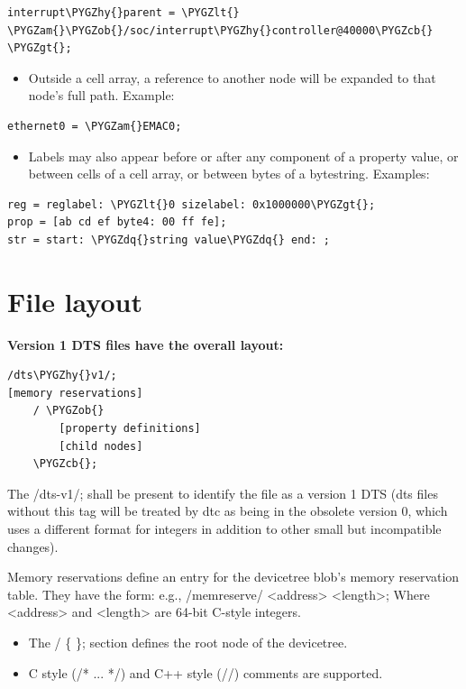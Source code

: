 \documentclass[a4paper,10pt,oneside]{sphinxmanual}
\def\PYGZob{\char`\{}
\def\PYGZcb{\char`\}}
\def\PYGZam{\char`\&}
\def\PYGZlt{\char`\<}
\def\PYGZgt{\char`\>}
\def\PYGZhy{\char`\-}
\def\PYGZdq{\char`\"}
\begin{document}
\begin{Verbatim}[commandchars=\\\{\}]
interrupt\PYGZhy{}parent = \PYGZlt{} \PYGZam{}\PYGZob{}/soc/interrupt\PYGZhy{}controller@40000\PYGZcb{} \PYGZgt{};
\end{Verbatim}
\begin{itemize}
\item {} 
Outside a cell array, a reference to another node will be expanded to
that node’s full path. Example:

\end{itemize}

\begin{Verbatim}[commandchars=\\\{\}]
ethernet0 = \PYGZam{}EMAC0;
\end{Verbatim}
\begin{itemize}
\item {} 
Labels may also appear before or after any component of a property
value, or between cells of a cell array, or between bytes of a
bytestring. Examples:

\end{itemize}

\begin{Verbatim}[commandchars=\\\{\}]
reg = reglabel: \PYGZlt{}0 sizelabel: 0x1000000\PYGZgt{};
prop = [ab cd ef byte4: 00 ff fe];
str = start: \PYGZdq{}string value\PYGZdq{} end: ;
\end{Verbatim}


\section{File layout}
\label{source-language:file-layout}
\textbf{Version 1 DTS files have the overall layout:}

\begin{Verbatim}[commandchars=\\\{\}]
/dts\PYGZhy{}v1/;
[memory reservations]
    / \PYGZob{}
        [property definitions]
        [child nodes]
    \PYGZcb{};
\end{Verbatim}

The /dts-v1/; shall be present to identify the file as a version 1 DTS
(dts files without this tag will be treated by dtc as being in the
obsolete version 0, which uses a different format for integers in
addition to other small but incompatible changes).

Memory reservations define an entry for the devicetree blob’s memory
reservation table. They have the form: e.g., /memreserve/ \textless{}address\textgreater{}
\textless{}length\textgreater{}; Where \textless{}address\textgreater{} and \textless{}length\textgreater{} are 64-bit C-style integers.
\begin{itemize}
\item {} 
The / \{ \}; section defines the root node of the devicetree.

\item {} 
C style (/* ... */) and C++ style (//) comments are supported.

\end{itemize}
\end{document}
